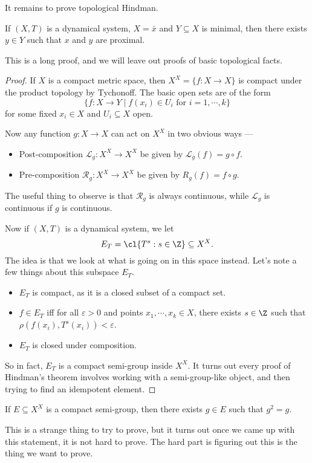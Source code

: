 \documentclass[a4paper]{article}
\begin{document}
It remains to prove topological Hindman.
\begin{thm}
  If $(X, T)$ is a dynamical system, $X = \bar{x}$ and $Y \subseteq X$ is minimal, then there exists $y \in Y$ such that $x$ and $y$ are proximal.
\end{thm}

This is a long proof, and we will leave out proofs of basic topological facts.
\begin{proof}
  If $X$ is a compact metric space, then $X^X = \{f: X \to X\}$ is compact under the product topology by Tychonoff. The basic open sets are of the form
  \[
    \{f: X \to Y \mid f(x_i) \in U_i\text{ for }i = 1, \cdots, k\}
  \]
  for some fixed $x_i \in X$ and $U_i \subseteq X$ open.

  Now any function $g: X \to X$ can act on $X^X$ in two obvious ways ---
  \begin{itemize}
    \item Post-composition $\mathcal{L}_g: X^X \to X^X$ be given by $\mathcal{L}_g(f) = g \circ f$.
    \item Pre-composition $\mathcal{R}_g: X^X \to X^X$ be given by $R_g(f) = f \circ g$.
  \end{itemize}
  The useful thing to observe is that $\mathcal{R}_g$ is always continuous, while $\mathcal{L}_g$ is continuous if $g$ is continuous.

  Now if $(X, T)$ is a dynamical system, we let
  \[
    E_T = \cl \{T^s: s \in \Z \} \subseteq X^X.
  \]
  The idea is that we look at what is going on in this space instead. Let's note a few things about this subspace $E_T$.
  \begin{itemize}
    \item $E_T$ is compact, as it is a closed subset of a compact set.
    \item $f \in E_T$ iff for all $\varepsilon > 0$ and points $x_1, \cdots, x_k \in X$, there exists $s \in \Z$ such that $\rho(f(x_i), T^s(x_i)) < \varepsilon$.
    \item $E_T$ is closed under composition.
  \end{itemize}
  So in fact, $E_T$ is a compact semi-group inside $X^X$. It turns out every proof of Hindman's theorem involves working with a semi-group-like object, and then trying to find an idempotent element.
\end{proof}

\begin{thm}
  If $E \subseteq X^X$ is a compact semi-group, then there exists $g \in E$ such that $g^2 = g$.
\end{thm}
This is a strange thing to try to prove, but it turns out once we came up with this statement, it is not hard to prove. The hard part is figuring out this is the thing we want to prove.
\end{document}
